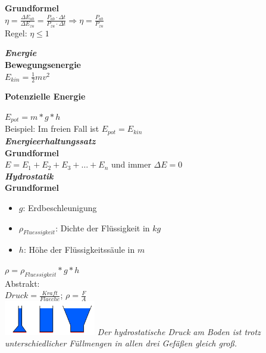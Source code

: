 \documentclass[a4paper,9pt]{article}
\begin{document}
\begin{multicols}{4}
\textbf{Grundformel}\\
	\(\eta = \frac{{\Delta {E_{ab}}}}{{\Delta {E_{zu}}}} = \frac{{{P_{ab}} \cdot \Delta t}}{{{P_{zu}} \cdot \Delta t}} \Rightarrow \eta = \frac{{{P_{ab}}}}{{{P_{zu}}}}\)
	\\
	Regel: \(\eta \leq 1\)
	

\textbf{\textit{Energie}}\\
	

\textbf{Bewegungsenergie}\\
	
	\(E_{kin} = \frac{1}{2} mv^2\)
	
	

\textbf{Potenzielle Energie}
	
	\(E_{pot} = m * g * h\)\\
	Beispiel: Im freien Fall ist \(E_{pot} = E_{kin}\)\\
	
	
	

\textbf{\textit{Energieerhaltungssatz}}\\
	

\textbf{Grundformel}\\
	\(E = E_1 + E_2 + E_3 + \dots + E_n\) und immer \(\Delta E = 0\)\\
	
	

\textbf{\textit{Hydrostatik}}\\
	

\textbf{Grundformel}\\
	\begin{itemize}
		\item \(g\): Erdbeschleunigung
		\item \(\rho_{Fluessigkeit}\): Dichte der Flüssigkeit in \(kg\)
		\item \(h\): Höhe der Flüssigkeitssäule in \(m\)
	\end{itemize}
	\(\rho = \rho_{Fluessigkeit} * g * h\)\\
	Abstrakt:\\
	\(Druck = \frac{Kraft}{Flaeche}\); \(\rho = \frac{F}{A}\) \\
	\includegraphics[width=4cm]{hydrostatik}
	\textit{Der hydrostatische Druck am Boden ist trotz unterschiedlicher Füllmengen in allen drei Gefäßen gleich groß.}
	
	  


\end{multicols}
\end{document}
